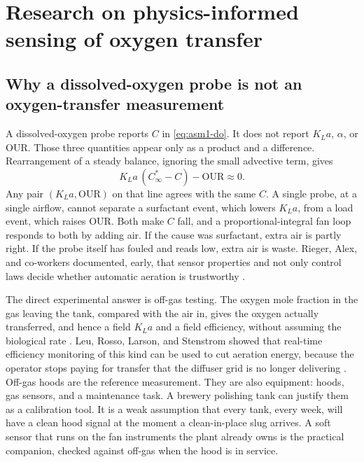 \section{Research on physics-informed sensing of oxygen transfer}
\label{sec:prev-sensor}

\subsection{Why a dissolved-oxygen probe is not an oxygen-transfer measurement}

A dissolved-oxygen probe reports $C$ in \eqref{eq:asm1-do}. It does not report $K_La$, $\alpha$, or $\mathrm{OUR}$. Those three quantities appear only as a product and a difference. Rearrangement of a steady balance, ignoring the small advective term, gives
\begin{equation}
\label{eq:unident}
K_La\,(C^{*}_{\infty}-C)
-
\mathrm{OUR}
\approx 0.
\end{equation}
Any pair $(K_La,\mathrm{OUR})$ on that line agrees with the same $C$. A single probe, at a single airflow, cannot separate a surfactant event, which lowers $K_La$, from a load event, which raises $\mathrm{OUR}$. Both make $C$ fall, and a proportional-integral fan loop responds to both by adding air. If the cause was surfactant, extra air is partly right. If the probe itself has fouled and reads low, extra air is waste. Rieger, Alex, and co-workers documented, early, that sensor properties and not only control laws decide whether automatic aeration is trustworthy \cite{rieger2003sensors,olsson2012ica}.

The direct experimental answer is off-gas testing. The oxygen mole fraction in the gas leaving the tank, compared with the air in, gives the oxygen actually transferred, and hence a field $K_La$ and a field efficiency, without assuming the biological rate \cite{redmon1983,leu2009,asce2007oxygen}. Leu, Rosso, Larson, and Stenstrom showed that real-time efficiency monitoring of this kind can be used to cut aeration energy, because the operator stops paying for transfer that the diffuser grid is no longer delivering \cite{leu2009,rosso2008state}. Off-gas hoods are the reference measurement. They are also equipment: hoods, gas sensors, and a maintenance task. A brewery polishing tank can justify them as a calibration tool. It is a weak assumption that every tank, every week, will have a clean hood signal at the moment a clean-in-place slug arrives. A soft sensor that runs on the fan instruments the plant already owns is the practical companion, checked against off-gas when the hood is in service.

